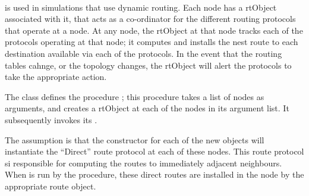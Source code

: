 \paragraph{}
is used in simulations that use dynamic routing.
Each node has a rtObject associated with it, that
acts as a co-ordinator for the different routing protocols that
operate at a node.
At any node, the rtObject at that node 
tracks each of the protocols operating at that node;
it computes and installs the nest route to each destination
available via each of the protocols.
In the event that the routing tables cahnge, or the topology changes,
the rtObject will alert the protocols to take the appropriate action.

The class defines the procedure
;
this procedure takes a list of nodes as arguments,
and creates a rtObject at each of the nodes in its argument list.
It subsequently invokes its .

The assumption is that the constructor for each of the new objects
will instantiate the ``Direct'' route protocol at each of these nodes.
This route protocol si responsible for computing the routes to 
immediately adjacent neighbours.
When  is run by the  
procedure, these direct routes are installed in the node by the
appropriate route object.

